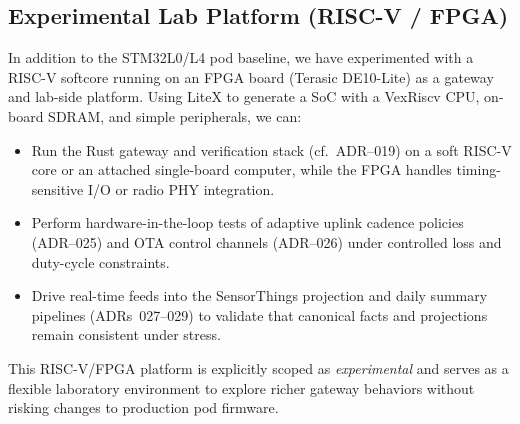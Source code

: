 \subsection{Experimental Lab Platform (RISC-V / FPGA)}
\label{subsec:riscv_fpga_gateway}

In addition to the STM32L0/L4 pod baseline, we have experimented with a RISC-V softcore running on an FPGA board (Terasic DE10-Lite) as a gateway and lab-side platform.
Using LiteX to generate a SoC with a VexRiscv CPU, on-board SDRAM, and simple peripherals, we can:
\begin{itemize}[nosep]
  \item Run the Rust gateway and verification stack (cf.~\ac{ADR}--019) on a soft RISC-V core or an attached single-board computer, while the FPGA handles timing-sensitive I/O or radio PHY integration.
  \item Perform hardware-in-the-loop tests of adaptive uplink cadence policies (ADR--025) and OTA control channels (\ac{ADR}--026) under controlled loss and duty-cycle constraints.
  \item Drive real-time feeds into the SensorThings projection and daily summary pipelines (\ac{ADR}s~027--029) to validate that canonical facts and projections remain consistent under stress.
\end{itemize}

This RISC-V/FPGA platform is explicitly scoped as \emph{experimental} and serves as a flexible laboratory environment to explore richer gateway behaviors without risking changes to production pod firmware.
